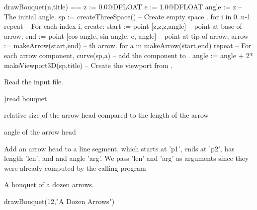 \begin{xmpLines}
drawBouquet(n,title) ==
  z := 0.0@DFLOAT
  e := 1.0@DFLOAT
  angle := z                                        -- The initial angle.
  sp := createThreeSpace()                          -- Create empty space .
  for i in 0..n-1 repeat                            -- For each index i, create:
    start := point [z,z,z,angle]                    -- point at base of arrow;
    end   := point [cos angle, sin angle, e, angle] -- point at tip of arrow;
    arrow := makeArrow(start,end)                   -- th arrow.
    for a in makeArrow(start,end) repeat            -- For each arrow component,
      curve(sp,a)                                   -- \quad{}add the component to .
    angle := angle + 2*%
  makeViewport3D(sp,title)                          -- Create the viewport from .
\end{xmpLines}

\begin{xtc}
\begin{xtccomment}
Read the input file.
\end{xtccomment}
\begin{spadsrc}
)read bouquet
\end{spadsrc}
relative size of the arrow head compared to the length of the arrow
\begin{TeXOutput}
\begin{fricasmath}{1}
%
\end{fricasmath}
\end{TeXOutput}
angle of the arrow head
\begin{TeXOutput}
\begin{fricasmath}{2}
%
\end{fricasmath}
\end{TeXOutput}
Add an arrow head to a line segment, which starts at 'p1', ends at 'p2',
has length 'len', and and angle 'arg'.  We pass 'len' and 'arg' as
arguments since they were already computed by the calling program
\end{xtc}
\begin{psXtc}
\begin{xtccomment}
A bouquet of a dozen arrows.
\end{xtccomment}
\begin{spadsrc}
drawBouquet(12,"A Dozen Arrows")
\end{spadsrc}
\end{psXtc}
\

